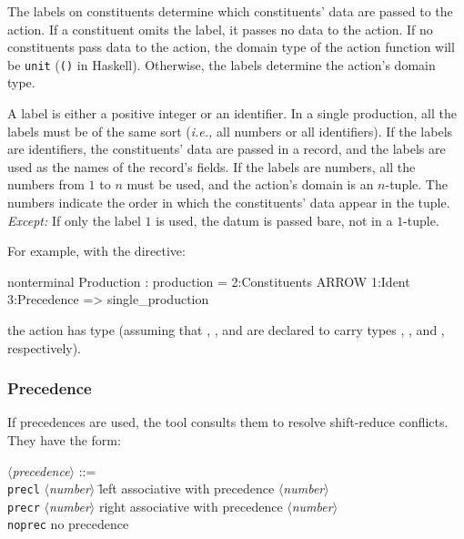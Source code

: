\documentclass[10pt]{article}
\newcommand{\nonterm}[1]{\mbox{$\langle${\it{}#1}$\rangle$}}
\begin{document}
\begin{strictcode}
\begin{strictcode}
\begin{strictcode}
\begin{strictcode}
\begin{strictcode}
\begin{strictcode}
\begin{strictcode}
The labels on constituents determine which constituents' data are
passed to the action.  If a constituent omits the label, it passes no
data to the action.  If no constituents pass data to the action, the
domain type of the action function will be {\tt unit} ({\tt ()} in
Haskell).  Otherwise, the labels determine the action's domain type.

A label is either a positive integer or an identifier.  In a single
production, all the labels must be of the same sort ({\em i.e.,} all
numbers or all identifiers).  If the labels are identifiers, the
constituents' data are passed in a record, and the labels are used as
the names of the record's fields.  If the labels are numbers, all the
numbers from $1$ to $n$ must be used, and the action's domain is an
$n$-tuple.  The numbers indicate the order in which the constituents'
data appear in the tuple.  {\em Except:} If only the label $1$ is
used, the datum is passed bare, not in a $1$-tuple.

For example, with the directive:

\begin{code}
nonterminal Production : production =
   2:Constituents ARROW 1:Ident 3:Precedence => single_production
\end{code}

\noindent
the action  has type  (assuming that , , and
 are declared to carry types ,
, and , respectively).



\subsubsection{Precedence}

If precedences are used, the tool consults them to resolve
shift-reduce conflicts.  They have the form:

\begin{tabbing}
\nonterm{precedence} ::=
\\
\quad \=
{\tt precl} \nonterm{number} \quad
\= left associative with precedence \nonterm{number}
\\ \>
{\tt precr} \nonterm{number} \>
right associative with precedence \nonterm{number}
\\ \>
{\tt noprec} \>
no precedence
\end{tabbing}


\end{strictcode}
\end{strictcode}
\end{strictcode}
\end{strictcode}
\end{strictcode}
\end{strictcode}
\end{strictcode}
\end{document}
